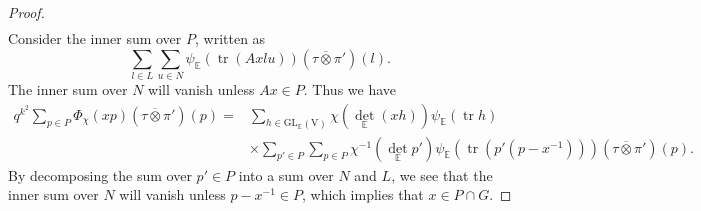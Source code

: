 \documentclass[12pt, reqno]{amsart}
\theoremstyle{definition}
\theoremstyle{definition}
\theoremstyle{definition}
\newcommand{\detQuadratic}{{\det}_{\quadraticExtension}}
\newcommand{\hermitianSpace}{\mathrm{V}}
\newcommand{\fieldCharacter}{\psi}
\newcommand{\trace}{\operatorname{tr}}
\newcommand{\GL}{\mathrm{GL}}
\newcommand{\quadraticExtension}{\mathbb{E}}
\begin{document}
\begin{proof}
\begin{align*}
	\end{align*}
	Consider the inner sum over $P$, written as $$\sum_{l \in L} \sum_{u \in N} \fieldCharacter_{\quadraticExtension}\left(\trace\left(A x l u\right)\right) \left(\tau \overline{\otimes} \pi'\right)\left(l\right).$$
	The inner sum over $N$ will vanish unless $Ax \in P$. Thus we have
	\begin{align*}
		q^{k^2} \sum_{p \in P} \Phi_{\chi}\left(xp\right) \left(\tau \overline{\otimes} \pi'\right)\left(p\right) =& \sum_{h \in \GL_{\quadraticExtension}\left(\hermitianSpace\right)}  \chi\left(\detQuadratic\left(xh\right)\right) \fieldCharacter_{\quadraticExtension}\left(\trace h\right) \\
		& \times \sum_{p' \in P} \sum_{p \in P} \chi^{-1}\left(\detQuadratic p'\right) \fieldCharacter_{\quadraticExtension}\left(\trace\left(p' \left(p - x^{-1}\right)\right)\right) \left(\tau \overline{\otimes} \pi'\right)\left(p\right).
	\end{align*}
	By decomposing the sum over $p' \in P$ into a sum over $N$ and $L$, we see that the inner sum over $N$ will vanish unless $p - x^{-1} \in P$, which implies that $x \in P \cap G$.
	

\end{proof}
\end{document}
